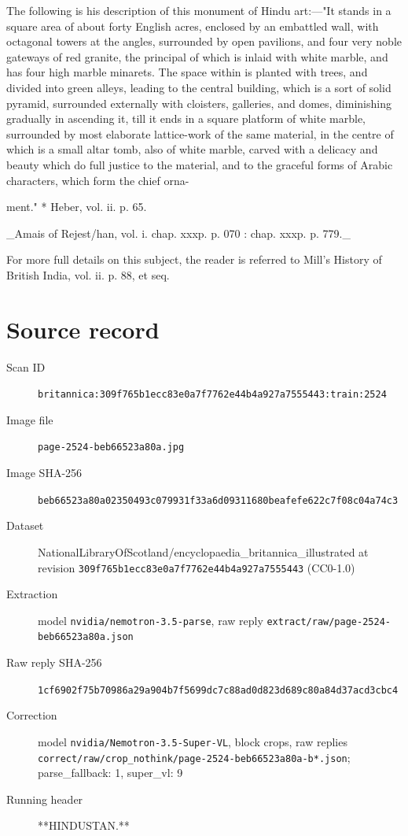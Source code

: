 \documentclass{article}
\begin{document}
The following is his description of this monument of Hindu art:—"It stands in a square area of about forty English acres, enclosed by an embattled wall, with octagonal towers at the angles, surrounded by open pavilions, and four very noble gateways of red granite, the principal of which is inlaid with white marble, and has four high marble minarets. The space within is planted with trees, and divided into green alleys, leading to the central building, which is a sort of solid pyramid, surrounded externally with cloisters, galleries, and domes, diminishing gradually in ascending it, till it ends in a square platform of white marble, surrounded by most elaborate lattice-work of the same material, in the centre of which is a small altar tomb, also of white marble, carved with a delicacy and beauty which do full justice to the material, and to the graceful forms of Arabic characters, which form the chief orna-

ment."
* Heber, vol. ii. p. 65.

\_Amais of Rejest/han, vol. i. chap. xxxp. p. 070 : chap. xxxp. p. 779.\_

For more full details on this subject, the reader is referred to Mill's History of British India, vol. ii. p. 88, et seq.


\section*{Source record}
\begin{description}
\item[Scan ID] \texttt{britannica:309f765b1ecc83e0a7f7762e44b4a927a7555443:train:2524}
\item[Image file] \texttt{page-2524-beb66523a80a.jpg}
\item[Image SHA-256] \texttt{beb66523a80a02350493c079931f33a6d09311680beafefe622c7f08c04a74c3}
\item[Dataset] NationalLibraryOfScotland/encyclopaedia\_britannica\_illustrated at revision \texttt{309f765b1ecc83e0a7f7762e44b4a927a7555443} (CC0-1.0)
\item[Extraction] model \texttt{nvidia/nemotron-3.5-parse}, raw reply \texttt{extract/raw/page-2524-beb66523a80a.json}
\item[Raw reply SHA-256] \texttt{1cf6902f75b70986a29a904b7f5699dc7c88ad0d823d689c80a84d37acd3cbc4}
\item[Correction] model \texttt{nvidia/Nemotron-3.5-Super-VL}, block crops, raw replies \texttt{correct/raw/crop\_nothink/page-2524-beb66523a80a-b*.json}; parse\_fallback: 1, super\_vl: 9
\item[Running header] **HINDUSTAN.**
\end{description}
\end{document}
